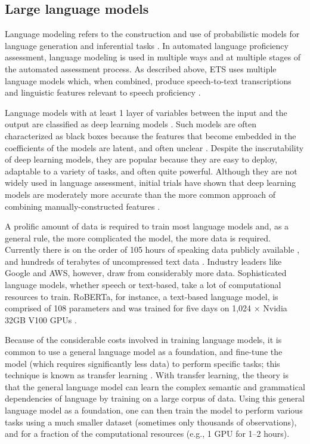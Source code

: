 \documentclass [PhD] {uclathes}
\begin{document}
\subsection{Large language models}

Language modeling refers to the construction and use of probabilistic models for language generation and inferential tasks \citep{jurafskyspeech}. In automated language proficiency assessment, language modeling is used in multiple ways and at multiple stages of the automated assessment process. As described above, ETS uses multiple language models which, when combined, produce speech-to-text transcriptions and linguistic features relevant to speech proficiency \citep{qian2019automatic}.

Language models with at least 1 layer of variables between the input and the output are classified as deep learning models \citep{goodfellow2016deep}. Such models are often characterized as black boxes because the features that become embedded in the coefficients of the models are latent, and often unclear \citep[e.g.][]{gretter2019automatic}. Despite the inscrutability of deep learning models, they are popular because they are easy to deploy, adaptable to a variety of tasks, and often quite powerful. Although they are not widely used in language assessment, initial trials have shown that deep learning models are moderately more accurate than the more common approach of combining manually-constructed features \citep{chen2018end}.

A prolific amount of data is required to train most language models and, as a general rule, the more complicated the model, the more data is required. Currently there is on the order of 105 hours of speaking data publicly available \citep{galvez2021people}, and hundreds of terabytes of uncompressed text data \citep{iderhoff2023}. Industry leaders like Google and AWS, however, draw from considerably more data. Sophisticated language models, whether speech or text-based, take a lot of computational resources to train. RoBERTa, for instance, a text-based language model, is comprised of 108 parameters and was trained for five days on 1,024 × Nvidia 32GB V100 GPUs \citep{liu2019roberta}.

Because of the considerable costs involved in training language models, it is common to use a general language model as a foundation, and fine-tune the model (which requires significantly less data) to perform specific tasks; this technique is known as transfer learning \citep{jurafskyspeech}. With transfer learning, the theory is that the general language model can learn the complex semantic and grammatical dependencies of language by training on a large corpus of data. Using this general language model as a foundation, one can then train the model to perform various tasks using a much smaller dataset (sometimes only thousands of observations), and for a fraction of the computational resources (e.g., 1 GPU for 1–2 hours).
\end{document}
